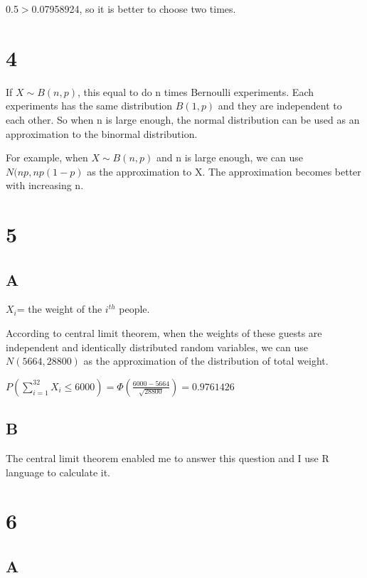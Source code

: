 \documentclass{article}
\begin{document}
	\hspace*{\fill}
	
	0.5$>$0.07958924, so it is better to choose two times.
	
	\section*{4}
	
	If $X\sim B(n,p)$, this equal to do n times Bernoulli experiments. Each experiments has the same distribution $B(1,p)$ and they are independent to each other. So when n is large enough, the normal distribution can be used as an approximation to the binormal distribution. 
	
	For example, when $X\sim B(n,p)$ and n is large enough, we can use $N(np,np(1-p)$ as the approximation to X. The approximation becomes better with increasing n.
	
	\section*{5}
	
	\subsection*{A}
	
	$X_i$= the weight of the $i^{th}$ people.
	
	According to central limit theorem, when the weights of these guests are independent and identically distributed random variables, we can use $N(5664,28800)$ as the approximation of the distribution of total weight.
	
	 $P(\sum_{i=1}^{32} X_i\le 6000)=\Phi(\frac{6000-5664}{\sqrt{28800}})=0.9761426$
	
	\subsection*{B}
	
	The central limit theorem enabled me to answer this question and I use R language to calculate it.
	
	\section*{6}
	
	\subsection*{A}
	
\end{document}
